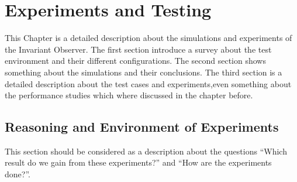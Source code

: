 \chapter{Experiments and Testing}
\label{chapter:4}

\ifpdf
    \graphicspath{{Chapter3/Figs/Raster/}{Chapter3/Figs/PDF/}{Chapter3/Figs/}}
\else
    \graphicspath{{Chapter3/Figs/Vector/}{Chapter3/Figs/}}
\fi

This Chapter is a detailed description about the simulations and experiments of the Invariant Observer.
The first section introduce a survey about the test environment and their different configurations.
The second section shows something about the simulations and their conclusions.
The third section is a detailed description about the test cases and experiments,even something about the performance studies which where
discussed in the chapter before. \\



\section{Reasoning and Environment of Experiments}
This section should be considered as a description about the questions ``Which result do we gain from these experiments?'' and ``How are the experiments done?''. 

